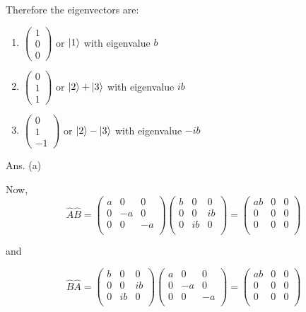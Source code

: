 \documentclass[12pt]{article}
\begin{document}
Therefore the eigenvectors are:

\begin{enumerate}
\item $\begin{pmatrix}1\\0\\0\end{pmatrix}$  or $\Ket{1}$ with eigenvalue $b$
\item $\begin{pmatrix}0\\1\\1\end{pmatrix}$ or $\Ket{2}+\Ket{3}$ with eigenvalue $ib$
\item $\begin{pmatrix}0\\1\\-1\end{pmatrix}$ or $\Ket{2}-\Ket{3}$ with eigenvalue $-ib$
\end{enumerate}
\hfill Ans. (a)

Now,
$$\hat A\hat B=\left(
\begin{array}{ccc}
 a & 0 & 0 \\
 0 & -a & 0 \\
 0 & 0 & -a \\
\end{array}
\right) \left(
\begin{array}{ccc}
 b & 0 & 0 \\
 0 & 0 & i b \\
 0 & i b & 0 \\
\end{array}
\right)=\left(
\begin{array}{ccc}
 a b & 0 & 0 \\
 0 & 0 & 0 \\
 0 & 0 & 0 \\
\end{array}
\right)$$

and 

$$\hat B\hat A= \left(
\begin{array}{ccc}
 b & 0 & 0 \\
 0 & 0 & i b \\
 0 & i b & 0 \\
\end{array}
\right)\left(
\begin{array}{ccc}
 a & 0 & 0 \\
 0 & -a & 0 \\
 0 & 0 & -a \\
\end{array}
\right)=\left(
\begin{array}{ccc}
 a b & 0 & 0 \\
 0 & 0 & 0 \\
 0 & 0 & 0 \\
\end{array}
\right)$$
\end{document}
